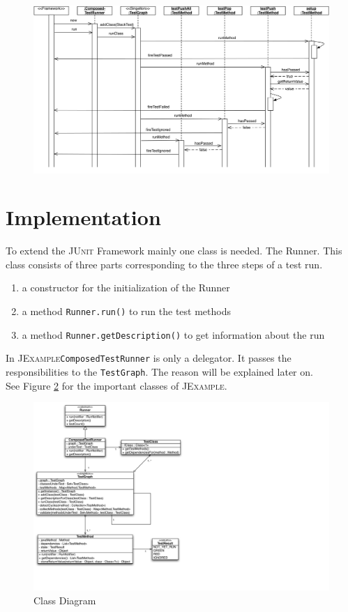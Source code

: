 \documentclass[11pt]{article}
\newcommand{\JUnit}{\textsc{JUnit}\xspace}
\newcommand{\JExample}{\textsc{JExample}\xspace}
\begin{document}
\begin{figure}[htbp]
 \includegraphics[width=15.0cm]{testPush.pdf}
 \caption{}
 \label{fig:testPush}
\end{figure}

\section{Implementation}

To extend the \JUnit Framework mainly one class is needed. The Runner. This class consists of three parts corresponding to the three steps of a test run.

\begin{enumerate}
 \item a constructor for the initialization of the Runner
 \item a method \verb|Runner.run()| to run the test methods
 \item a method \verb|Runner.getDescription()| to get information about the run
\end{enumerate}
In \JExample \verb|ComposedTestRunner| is only a delegator. It passes the responsibilities to the \verb|TestGraph|. The reason will be explained later on.\\
See Figure \ref{fig:classDiag} for the important classes of \JExample.

\begin{figure}[htbp]
 \includegraphics[width=24.0cm]{classdiagram.pdf}
 \caption{Class Diagram}
 \label{fig:classDiag}
\end{figure}
\end{document}
